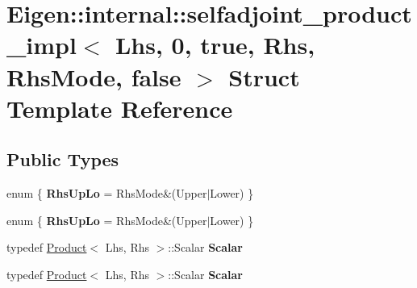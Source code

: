 \hypertarget{struct_eigen_1_1internal_1_1selfadjoint__product__impl_3_01_lhs_00_010_00_01true_00_01_rhs_00_01_rhs_mode_00_01false_01_4}{}\section{Eigen\+:\+:internal\+:\+:selfadjoint\+\_\+product\+\_\+impl$<$ Lhs, 0, true, Rhs, Rhs\+Mode, false $>$ Struct Template Reference}
\label{struct_eigen_1_1internal_1_1selfadjoint__product__impl_3_01_lhs_00_010_00_01true_00_01_rhs_00_01_rhs_mode_00_01false_01_4}
\subsection*{Public Types}
\begin{DoxyCompactItemize}
\item 
\mbox{\label{struct_eigen_1_1internal_1_1selfadjoint__product__impl_3_01_lhs_00_010_00_01true_00_01_rhs_00_01_rhs_mode_00_01false_01_4_a68bd26bda8d891451f23906f7f62ada5}} 
enum \{ {\bfseries Rhs\+Up\+Lo} = Rhs\+Mode\&(Upper$\vert$\+Lower)
 \}
\item 
\mbox{\label{struct_eigen_1_1internal_1_1selfadjoint__product__impl_3_01_lhs_00_010_00_01true_00_01_rhs_00_01_rhs_mode_00_01false_01_4_a5af7160a772462a539243b5fb3445ec7}} 
enum \{ {\bfseries Rhs\+Up\+Lo} = Rhs\+Mode\&(Upper$\vert$\+Lower)
 \}
\item 
\mbox{\label{struct_eigen_1_1internal_1_1selfadjoint__product__impl_3_01_lhs_00_010_00_01true_00_01_rhs_00_01_rhs_mode_00_01false_01_4_a892de9df7cc9490ebe251092ae68445c}} 
typedef \hyperlink{group___core___module_class_eigen_1_1_product}{Product}$<$ Lhs, Rhs $>$\+::Scalar {\bfseries Scalar}
\item 
\mbox{\label{struct_eigen_1_1internal_1_1selfadjoint__product__impl_3_01_lhs_00_010_00_01true_00_01_rhs_00_01_rhs_mode_00_01false_01_4_a892de9df7cc9490ebe251092ae68445c}} 
typedef \hyperlink{group___core___module_class_eigen_1_1_product}{Product}$<$ Lhs, Rhs $>$\+::Scalar {\bfseries Scalar}
\end{DoxyCompactItemize}
